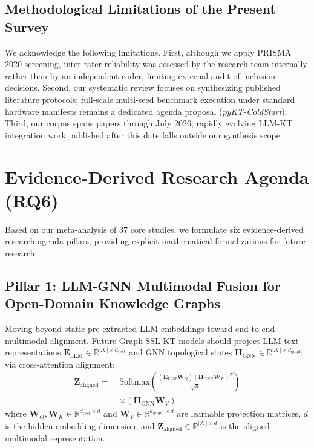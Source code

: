 \documentclass[journal]{IEEEtran}
\begin{document}
\subsection{Methodological Limitations of the Present Survey}
We acknowledge the following limitations. First, although we apply PRISMA 2020 screening, inter-rater reliability was assessed by the research team internally rather than by an independent coder, limiting external audit of inclusion decisions. Second, our systematic review focuses on synthesizing published literature protocols; full-scale multi-seed benchmark execution under standard hardware manifests remains a dedicated agenda proposal (\emph{pyKT-ColdStart}). Third, our corpus spans papers through July 2026; rapidly evolving LLM-KT integration work published after this date falls outside our synthesis scope.

\section{Evidence-Derived Research Agenda (RQ6)}
\label{sec:agenda}

Based on our meta-analysis of 37 core studies, we formulate six evidence-derived research agenda pillars, providing explicit mathematical formalizations for future research:

\subsection{Pillar 1: LLM-GNN Multimodal Fusion for Open-Domain Knowledge Graphs}
Moving beyond static pre-extracted LLM embeddings toward end-to-end multimodal alignment. Future Graph-SSL KT models should project LLM text representations $\mathbf{E}_{\text{LLM}} \in \mathbb{R}^{|\mathcal{K}| \times d_{\text{text}}}$ and GNN topological states $\mathbf{H}_{\text{GNN}} \in \mathbb{R}^{|\mathcal{K}| \times d_{\text{graph}}}$ via cross-attention alignment:
\begin{equation}
\begin{split}
\mathbf{Z}_{\text{aligned}} = \; & \text{Softmax}\left(\frac{(\mathbf{E}_{\text{LLM}}\mathbf{W}_Q)(\mathbf{H}_{\text{GNN}}\mathbf{W}_K)^T}{\sqrt{d}}\right) \\
& \times (\mathbf{H}_{\text{GNN}}\mathbf{W}_V)
\end{split}
\end{equation}
where $\mathbf{W}_Q, \mathbf{W}_K \in \mathbb{R}^{d_{\text{text}} \times d}$ and $\mathbf{W}_V \in \mathbb{R}^{d_{\text{graph}} \times d}$ are learnable projection matrices, $d$ is the hidden embedding dimension, and $\mathbf{Z}_{\text{aligned}} \in \mathbb{R}^{|\mathcal{K}| \times d}$ is the aligned multimodal representation.
\end{document}
